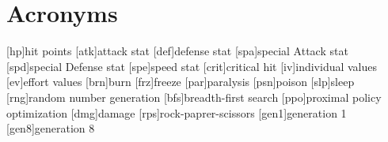 
\chapter*{Acronyms}

\begin{acronym}
	[hp]{hit points}
	[atk]{attack stat}
	[def]{defense stat}
	[spa]{special Attack stat}
	[spd]{special Defense stat}
	[spe]{speed stat}
	[crit]{critical hit}
	[iv]{individual values}
	[ev]{effort values}
	[brn]{burn}
	[frz]{freeze}
	[par]{paralysis}
	[psn]{poison}
	[slp]{sleep}
	[rng]{random number generation}
	[bfs]{breadth-first search}
	[ppo]{proximal policy optimization}
	[dmg]{damage}
	[rps]{rock-paprer-scissors}
	[gen1]{generation 1}
	[gen8]{generation 8}
\end{acronym}